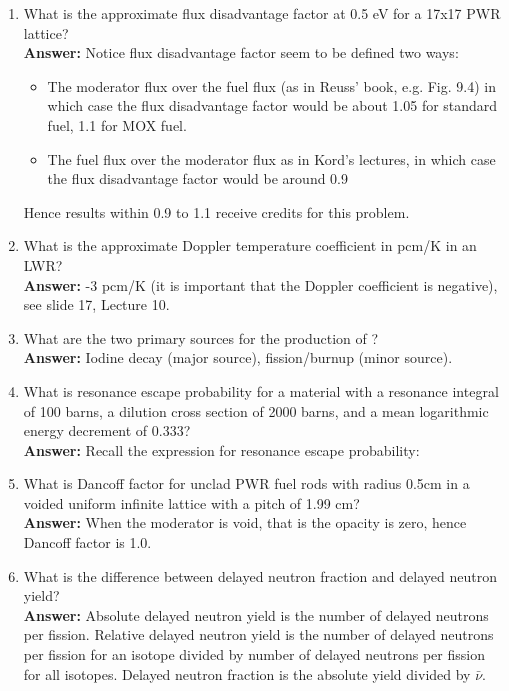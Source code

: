 \documentclass{school-22.211-notes}
\begin{document}
\begin{enumerate}
\begin{enumerate}
  \item What is the approximate flux disadvantage factor at 0.5 eV for a 17x17 PWR lattice? \\
    \textbf{Answer:} Notice flux disadvantage factor seem to be defined two ways: 
    \begin{itemize}
    \item The moderator flux over the fuel flux (as in Reuss' book, e.g. Fig. 9.4) in which case the flux disadvantage factor would be about 1.05 for standard fuel, 1.1 for MOX fuel. 
    \item The fuel flux over the moderator flux as in Kord's lectures, in which case the flux disadvantage factor would be around 0.9
    \end{itemize}
    Hence results within 0.9 to 1.1 receive credits for this problem. 

  \item What is the approximate Doppler temperature coefficient in pcm/K in an LWR? \\
    \textbf{Answer:} -3 pcm/K (it is important that the Doppler coefficient is negative), see slide 17, Lecture 10. 

  \item What are the two primary sources for the production of ? \\
    \textbf{Answer:} Iodine decay (major source), fission/burnup (minor source). 

  \item What is resonance escape probability for a material with a resonance integral of 100 barns, a dilution cross section of 2000 barns, and a mean logarithmic energy decrement of 0.333? \\
    \textbf{Answer:} Recall the expression for resonance escape probability: 

  \item What is Dancoff factor for unclad PWR fuel rods with radius 0.5cm in a voided uniform infinite lattice with a pitch of 1.99 cm? \\
    \textbf{Answer:} When the moderator is void, that is the opacity is zero, hence Dancoff factor is 1.0. 

  \item What is the difference between delayed neutron fraction and delayed neutron yield? \\
    \textbf{Answer:} Absolute delayed neutron yield is the number of delayed neutrons per fission. Relative delayed neutron yield is the number of delayed neutrons per fission for an isotope divided by number of delayed neutrons per fission for all isotopes. Delayed neutron fraction is the absolute yield divided by $\bar{\nu}$. 


\end{enumerate}
\end{enumerate}
\end{document}
